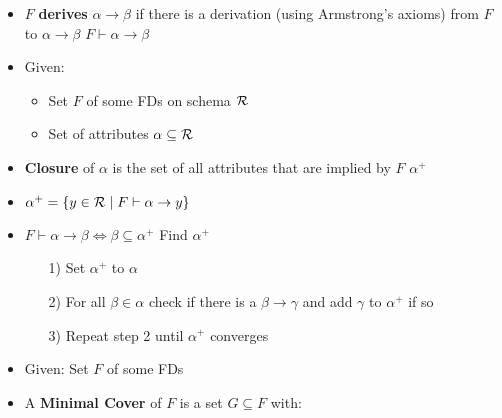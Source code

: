 \begin{itemize}
\begin{itemize}
\begin{itemize}
                \end{itemize}
            \item $F$ \textbf{derives} $\alpha \to \beta$ if there is a derivation (using Armstrong's axioms) from $F$ to $\alpha \to \beta$
             $F \vdash \alpha \to \beta$
        \end{itemize}
        \begin{itemize}
            \item Given:
                \begin{itemize}
                    \item Set $F$ of some FDs on schema $\mathcal{R}$
                    \item Set of attributes $\alpha \subseteq \mathcal{R}$
                \end{itemize}
            \item \textbf{Closure} of $\alpha$ is the set of all attributes that are implied by $F$
             $\alpha^+$
            \item $\alpha^+ = \{y \in \mathcal{R} \mid F \vdash \alpha \to y\}$
            \item $F \vdash \alpha \to \beta \iff \beta \subseteq \alpha^+$
             Find $\alpha^+$
                \begin{itemize}
                    \item[1)] Set $\alpha^+$ to $\alpha$
                    \item[2)] For all $\beta \in \alpha$ check if there is a $\beta \to \gamma$ and add $\gamma$ to $\alpha^+$ if so
                    \item[3)] Repeat step 2 until $\alpha^+$ converges
                \end{itemize}
        \end{itemize}
        \begin{itemize}
             Remove redundant FDs in a set of FDs
                \begin{itemize}
                    \item I.e. FDs which we can derive from the other FDs
                \end{itemize}
            \item Given: Set $F$ of some FDs
            \item A \textbf{Minimal Cover} of $F$ is a set $G \subseteq F$ with:
                \begin{itemize}

\end{itemize}
\end{itemize}
\end{itemize}
